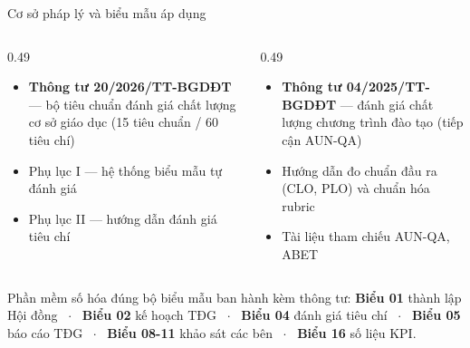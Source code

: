 \documentclass[aspectratio=169, 11pt]{beamer}
\begin{document}
\begin{frame}{Cơ sở pháp lý và biểu mẫu áp dụng}
\vspace{0.1cm}
\begin{columns}[T]
\begin{column}{0.49\textwidth}
\begin{tcolorbox}[enhanced, colback=lightwarm, colframe=daumaroon, boxrule=0pt, leftrule=3pt, arc=2pt, title=\textbf{Kiểm định CƠ SỞ GIÁO DỤC}, fonttitle=\bfseries\color{white}, coltitle=white, colbacktitle=daumaroon]
\scriptsize
\begin{itemize}
  \item \textbf{Thông tư 20/2026/TT-BGDĐT} — bộ tiêu chuẩn đánh giá chất lượng cơ sở giáo dục (15 tiêu chuẩn / 60 tiêu chí)
  \item Phụ lục I — hệ thống biểu mẫu tự đánh giá
  \item Phụ lục II — hướng dẫn đánh giá tiêu chí
\end{itemize}
\end{tcolorbox}
\end{column}
\begin{column}{0.49\textwidth}
\begin{tcolorbox}[enhanced, colback=lightnavy, colframe=daunavy, boxrule=0pt, leftrule=3pt, arc=2pt, title=\textbf{Kiểm định CHƯƠNG TRÌNH ĐÀO TẠO}, fonttitle=\bfseries\color{white}, coltitle=white, colbacktitle=daunavy]
\scriptsize
\begin{itemize}
  \item \textbf{Thông tư 04/2025/TT-BGDĐT} — đánh giá chất lượng chương trình đào tạo (tiếp cận AUN-QA)
  \item Hướng dẫn đo chuẩn đầu ra (CLO, PLO) và chuẩn hóa rubric
  \item Tài liệu tham chiếu AUN-QA, ABET
\end{itemize}
\end{tcolorbox}
\end{column}
\end{columns}
\vspace{0.2cm}
\begin{keypoint}
Phần mềm số hóa đúng bộ biểu mẫu ban hành kèm thông tư: \textbf{Biểu 01} thành lập Hội đồng \, $\cdot$ \, \textbf{Biểu 02} kế hoạch TĐG \, $\cdot$ \, \textbf{Biểu 04} đánh giá tiêu chí \, $\cdot$ \, \textbf{Biểu 05} báo cáo TĐG \, $\cdot$ \, \textbf{Biểu 08-11} khảo sát các bên \, $\cdot$ \, \textbf{Biểu 16} số liệu KPI.
\end{keypoint}
\end{frame}
\end{document}

